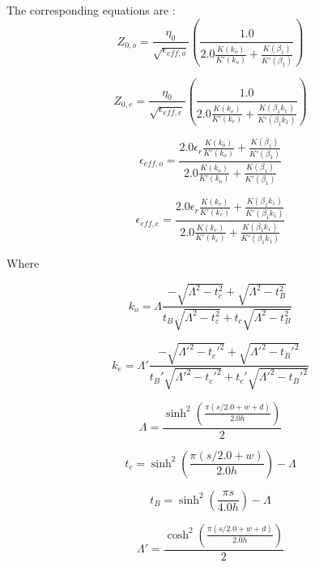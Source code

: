 The corresponding equations are \cite[~p197-198]{wadell}: 
\begin{equation}
Z_{0,o} = \frac{\eta_0}{\sqrt{\epsilon_{eff,o}}} \left( \frac{1.0}{2.0 \frac{K(k_o)}{K'(k_o)} + \frac{K(\beta_1)}{K'(\beta_1)}}\right)
\end{equation}    

\begin{equation}
Z_{0,e} = \frac{\eta_0}{\sqrt{\epsilon_{eff,e}}} \left( \frac{1.0}{2.0 \frac{K(k_e)}{K'(k_e)} + \frac{K(\beta_1 k_1)}{K'(\beta_1 k_1)}}\right)
\end{equation} 


\begin{equation}
\epsilon_{eff,o} = \frac{2.0 \epsilon_r \frac{K(k_o)}{K'(k_o)} + \frac{K(\beta_1)}{K'(\beta_1)}}{2.0 \frac{K(k_o)}{K'(k_o)} + \frac{K(\beta_1)}{K'(\beta_1)}}
\end{equation}

\begin{equation}
\epsilon_{eff,e} = \frac{2.0 \epsilon_r \frac{K(k_e)}{K'(k_e)} + \frac{K(\beta_1 k_1)}{K'(\beta_1 k_1)}}{2.0 \frac{K(k_e)}{K'(k_e)} + \frac{K(\beta_1 k_1)}{K'(\beta_1 k_1)}}
\end{equation}

Where

\begin{equation}
k_o = \Lambda \frac{-\sqrt{\Lambda^2 - t_c^2} + \sqrt{\Lambda^2 - t_B^2}}{t_B\sqrt{\Lambda^2 - t_c^2} + t_c \sqrt{\Lambda^2 - t_B^2}}
\end{equation}

\begin{equation}
k_e = \Lambda' \frac{-\sqrt{\Lambda'^2 - t_c'^2} + \sqrt{\Lambda'^2 - t_B'^2}}{t_B'\sqrt{\Lambda'^2 - t_c'^2} + t_c' \sqrt{\Lambda'^2 - t_B'^2}}
\end{equation}
    
    
\begin{equation}
\Lambda = \frac{\sinh^2 \left( \frac{\pi (s/2.0 + w + d)}{2.0 h} \right) }{2}
\end{equation}

\begin{equation}
t_c = \sinh^2 \left( \frac{\pi (s/2.0 + w)}{2.0 h} \right) - \Lambda
\end{equation}

\begin{equation}
t_B = \sinh^2 \left( \frac{\pi s}{4.0 h} \right) - \Lambda
\end{equation}


\begin{equation}
\Lambda' = \frac{\cosh^2 \left( \frac{\pi (s/2.0 + w + d)}{2.0 h} \right) }{2}
\end{equation}

